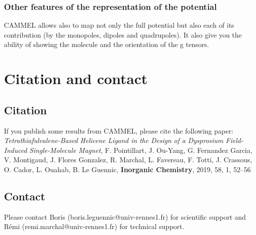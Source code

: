 \documentclass[12pt,a4paper]{article}
\begin{document}
\subsubsection{Other features of the representation of the potential}
CAMMEL allows also to map not only the full potential but also each of its contribution (by the monopoles, dipoles and quadrupoles). It also give you the ability of showing the molecule and the orientation of the g tensors.
\section{Citation and contact}
\subsection{Citation}
If you publish some results from CAMMEL, please cite the following paper:\\

\textit{Tetrathiafulvalene-Based Helicene Ligand in the Design of a Dysprosium Field-Induced Single-Molecule Magnet}, F. Pointillart, J. Ou-Yang, G. Fernandez Garcia, V. Montigaud, J. Flores Gonzalez, R. Marchal, L. Favereau, F. Totti, J. Crassous, O. Cador, L. Ouahab, B. Le Guennic, \textbf{Inorganic Chemistry}, 2019, 58, 1, 52–56 


\subsection{Contact}
Please contact Boris (boris.leguennic@univ-rennes1.fr) for scientific support and Rémi (remi.marchal@univ-rennes1.fr) for technical support.
\end{document}
